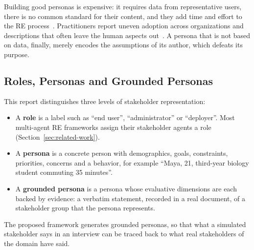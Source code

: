 Building good personas is expensive: it requires data from representative users, there is no common standard for their content, and they add time and effort to the RE process~\cite{karolita2023personas}. Practitioners report uneven adoption across organizations and descriptions that often leave the human aspects out~\cite{wang2025personas}. A persona that is not based on data, finally, merely encodes the assumptions of its author, which defeats its purpose.

\subsection{Roles, Personas and Grounded Personas}
\label{sec:bg-persona-grounding}

This report distinguishes three levels of stakeholder representation:
\begin{itemize}
    \item A \textbf{role} is a label such as ``end user'', ``administrator'' or ``deployer''. Most multi-agent RE frameworks assign their stakeholder agents a role (Section~\ref{sec:related-work}).
    \item A \textbf{persona} is a concrete person with demographics, goals, constraints, priorities, concerns and a behavior, for example ``Maya, 21, third-year biology student commuting 35 minutes''.
    \item A \textbf{grounded persona} is a persona whose evaluative dimensions are each backed by evidence: a verbatim statement, recorded in a real document, of a stakeholder group that the persona represents.
\end{itemize}
The proposed framework generates grounded personas, so that what a simulated stakeholder says in an interview can be traced back to what real stakeholders of the domain have said.
